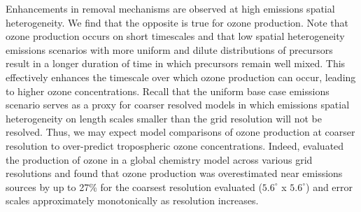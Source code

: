 Enhancements in removal mechanisms are observed at high emissions spatial heterogeneity. We find that the opposite is true for ozone production. Note that ozone production occurs on short timescales and that low spatial heterogeneity emissions scenarios with more uniform and dilute distributions of precursors result in a longer duration of time in which precursors remain well mixed. This effectively enhances the timescale over which ozone production can occur, leading to higher ozone concentrations. Recall that the uniform base case emissions scenario serves as a proxy for coarser resolved models in which emissions spatial heterogeneity on length scales smaller than the grid resolution will not be resolved. Thus, we may expect model comparisons of ozone production at coarser resolution to over-predict tropospheric ozone concentrations. Indeed, \textcite{wild_global_2006} evaluated the production of ozone in a global chemistry model across various grid resolutions and found that ozone production was overestimated near emissions sources by up to 27\% for the coarsest resolution evaluated ($5.6^{\circ}$ x $5.6^{\circ}$) and error scales approximately monotonically as resolution increases. 






